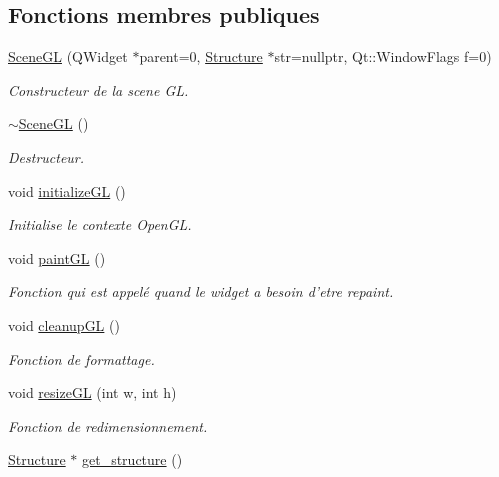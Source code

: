 \subsection*{Fonctions membres publiques}
\begin{DoxyCompactItemize}
\item 
\hyperlink{classSceneGL_a6af9b11a1a96b24ef2bd2d57c910ccbf}{Scene\+G\+L} (Q\+Widget $\ast$parent=0, \hyperlink{classStructure}{Structure} $\ast$str=nullptr, Qt\+::\+Window\+Flags f=0)
\begin{DoxyCompactList}\small\item\em Constructeur de la scene G\+L. \end{DoxyCompactList}\item 
\hyperlink{classSceneGL_a0e4266dea6edaca8b5274b9d74e4fe56}{$\sim$\+Scene\+G\+L} ()
\begin{DoxyCompactList}\small\item\em Destructeur. \end{DoxyCompactList}\item 
void \hyperlink{classSceneGL_ad81e01d02213ca0bdbec735260408f23}{initialize\+G\+L} ()
\begin{DoxyCompactList}\small\item\em Initialise le contexte Open\+G\+L. \end{DoxyCompactList}\item 
void \hyperlink{classSceneGL_a4e3548c5440b13ff4fe0fb76bc766276}{paint\+G\+L} ()
\begin{DoxyCompactList}\small\item\em Fonction qui est appelé quand le widget a besoin d'etre repaint. \end{DoxyCompactList}\item 
void \hyperlink{classSceneGL_a70997c4a649f1b17710a14549bf6990b}{cleanup\+G\+L} ()
\begin{DoxyCompactList}\small\item\em Fonction de formattage. \end{DoxyCompactList}\item 
void \hyperlink{classSceneGL_a45a49b85da1c7cb756b622c97028bf1b}{resize\+G\+L} (int w, int h)
\begin{DoxyCompactList}\small\item\em Fonction de redimensionnement. \end{DoxyCompactList}\item 
\hyperlink{classStructure}{Structure} $\ast$ \hyperlink{classSceneGL_a53d49272e92f87c42ee726604430e778}{get\+\_\+structure} ()

\end{DoxyCompactItemize}
